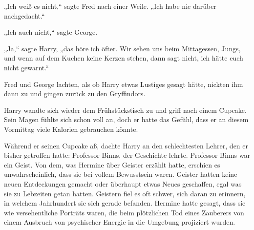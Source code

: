 „Ich weiß es nicht,“ sagte Fred nach einer Weile. „Ich habe nie darüber nachgedacht.“

„Ich auch nicht,“ sagte George.

„Ja,“ sagte Harry, „das höre ich öfter. Wir sehen uns beim Mittagessen, Jungs, und wenn auf dem Kuchen keine Kerzen stehen, dann sagt nicht, ich hätte euch nicht gewarnt.“

Fred und George lachten, als ob Harry etwas Lustiges gesagt hätte, nickten ihm dann zu und gingen zurück zu den Gryffindors.

Harry wandte sich wieder dem Frühstückstisch zu und griff nach einem Cupcake. Sein Magen fühlte sich schon voll an, doch er hatte das Gefühl, dass er an diesem Vormittag viele Kalorien gebrauchen könnte.

Während er seinen Cupcake aß, dachte Harry an den schlechtesten Lehrer, den er bisher getroffen hatte: Professor Binns, der Geschichte lehrte. Professor Binns war ein Geist. Von dem, was Hermine über Geister erzählt hatte, erschien es unwahrscheinlich, dass sie bei vollem Bewusstsein waren. Geister hatten keine neuen Entdeckungen gemacht oder überhaupt etwas Neues geschaffen, egal was sie zu Lebzeiten getan hatten. Geistern fiel es oft schwer, sich daran zu erinnern, in welchem Jahrhundert sie sich gerade befanden. Hermine hatte gesagt, dass sie wie versehentliche Porträts waren, die beim plötzlichen Tod eines Zauberers von einem Ausbruch von psychischer Energie in die Umgebung projiziert wurden.

